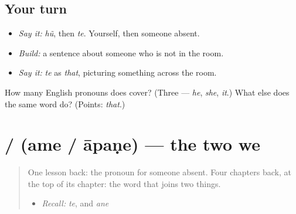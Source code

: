 \subsection*{Your turn}
\begin{itemize}
\raggedright
  \item \emph{Say it:} \emph{hũ}, then \emph{te}. Yourself, then someone absent.
  \item \emph{Build:} a sentence about someone who is not in the room.
  \item \emph{Say it:} \emph{te} as \emph{that}, picturing something across the room.
\end{itemize}

\begin{tcolorbox}[breakable,colback=teal!4,colframe=teal!35!black,title={Before you move on}]
How many English pronouns does \textbf{} cover? (Three — \emph{he}, \emph{she}, \emph{it}.) What else does the same word do? (Points: \emph{that}.)
\end{tcolorbox}
\section[\texorpdfstring{\gu{અમે} / \gu{આપણે} (ame / āpaṇe)}{અમે / આપણે (ame / āpaṇe)}]{ /  (ame / āpaṇe) — the two we}

\label{lesson:GU-C36-ame-aapne}



\begin{quote}
One lesson back: the pronoun for someone absent. Four chapters back, at the top of its chapter: the word that joins two things.

\begin{itemize}
\raggedright
  \item \emph{Recall:} \emph{te}, and \emph{ane}
\end{itemize}
\end{quote}

